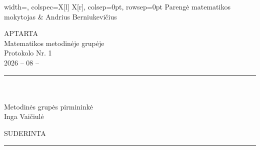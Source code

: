 \documentclass[11pt,a4paper]{article}
\begin{document}
\vspace{0.7cm}

\begin{tblr}{
  width=\textwidth,
  colspec={X[l] X[r]},
  colsep=0pt,
  rowsep=0pt
}
Parengė matematikos mokytojas
&
Andrius Berniukevičius
\end{tblr}

\vspace{1.25cm}

APTARTA\\
Matematikos metodinėje grupėje\\
Protokolo Nr. 1\\
2026 -- 08 --\\[0.42cm]

\rule{3.7cm}{0.4pt}\\[-1pt]
\hspace{0.75cm}{\small (parašas)}\\

Metodinės grupės pirmininkė\\
Inga Vaičiulė

\vspace{0.5cm}

SUDERINTA\\[0.42cm]

\rule{3.7cm}{0.4pt}\\[-1pt]
\hspace{0.75cm}{\small (parašas)}
\end{document}
